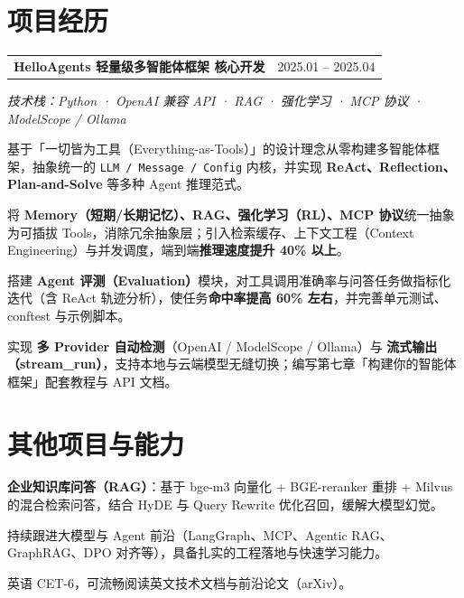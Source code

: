 \documentclass[9pt,a4paper]{article}
\makeatletter
\newcommand{\entry}[2]{%
  \par\vspace{2pt}%
  \begin{tabularx}{\textwidth}{@{}X@{}r@{}}
    \textbf{#1} & {\color{rulegray}\small #2}
  \end{tabularx}%
  \par}
\newcommand{\subentry}[1]{{\color{accent}\small\itshape #1}\par\vspace{1pt}}
\makeatother
\begin{document}
\section{项目经历}
\entry{HelloAgents 轻量级多智能体框架 \quad 核心开发}{2025.01 -- 2025.04}
\subentry{技术栈：Python · OpenAI 兼容 API · RAG · 强化学习 · MCP 协议 · ModelScope / Ollama}
\begin{tight}
  \item 基于「一切皆为工具（Everything-as-Tools）」的设计理念从零构建多智能体框架，抽象统一的 \texttt{LLM / Message / Config} 内核，并实现 \textbf{ReAct、Reflection、Plan-and-Solve} 等多种 Agent 推理范式。
  \item 将 \textbf{Memory（短期/长期记忆）、RAG、强化学习（RL）、MCP 协议}统一抽象为可插拔 Tools，消除冗余抽象层；引入检索缓存、上下文工程（Context Engineering）与并发调度，端到端\textbf{推理速度提升 40\% 以上}。
  \item 搭建 \textbf{Agent 评测（Evaluation）}模块，对工具调用准确率与问答任务做指标化迭代（含 ReAct 轨迹分析），使任务\textbf{命中率提高 60\% 左右}，并完善单元测试、conftest 与示例脚本。
  \item 实现 \textbf{多 Provider 自动检测}（OpenAI / ModelScope / Ollama）与 \textbf{流式输出（stream\_run）}，支持本地与云端模型无缝切换；编写第七章「构建你的智能体框架」配套教程与 API 文档。
\end{tight}

\section{其他项目与能力}
\begin{tight}
  \item \textbf{企业知识库问答（RAG）}：基于 bge-m3 向量化 + BGE-reranker 重排 + Milvus 的混合检索问答，结合 HyDE 与 Query Rewrite 优化召回，缓解大模型幻觉。
  \item 持续跟进大模型与 Agent 前沿（LangGraph、MCP、Agentic RAG、GraphRAG、DPO 对齐等），具备扎实的工程落地与快速学习能力。
  \item 英语 CET-6，可流畅阅读英文技术文档与前沿论文（arXiv）。
\end{tight}
\end{document}
